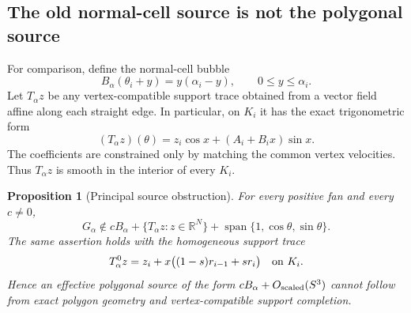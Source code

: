 \documentclass[11pt]{amsart}
\numberwithin{equation}{section}
\newtheorem{proposition}[theorem]{Proposition}
\theoremstyle{definition}
\theoremstyle{remark}
\newcommand{\R}{\mathbb R}
\begin{document}
\subsection{The old normal-cell source is not the polygonal source}

For comparison, define the normal-cell bubble
\begin{equation}\label{H0:eq:B}
 B_\alpha(\theta_i+y)=y(\alpha_i-y),
 \qquad 0\le y\le\alpha_i.
\end{equation}
Let $T_\alpha z$ be any vertex-compatible support trace obtained from a
vector field affine along each straight edge.  In particular, on $K_i$ it
has the exact trigonometric form
\begin{equation}\label{H0:eq:exact-trace-form}
 (T_\alpha z)(\theta)
 =z_i\cos x+(A_i+B_i x)\sin x.
\end{equation}
The coefficients are constrained only by matching the common vertex
velocities.  Thus $T_\alpha z$ is smooth in the interior of every $K_i$.

\begin{proposition}[Principal source obstruction]\label{H0:prop:obstruction}
For every positive fan and every $c\ne0$,
\begin{equation}\label{H0:eq:not-affine}
 G_\alpha\notin cB_\alpha+
 \{T_\alpha z:z\in\R^N\}+\operatorname {span}\{1,\cos\theta,\sin\theta\}.
\end{equation}
The same assertion holds with the homogeneous support trace
\begin{equation}\label{H0:eq:T0-pre}
 T_\alpha^0z
 =z_i+x\bigl((1-s)r_{i-1}+sr_i\bigr)
 \quad\hbox{on }K_i.
\end{equation}
Hence an effective polygonal source of the form
$cB_\alpha+O_{\rm scaled}(S^3)$ cannot follow from exact polygon geometry
and vertex-compatible support completion.
\end{proposition}
\end{document}
